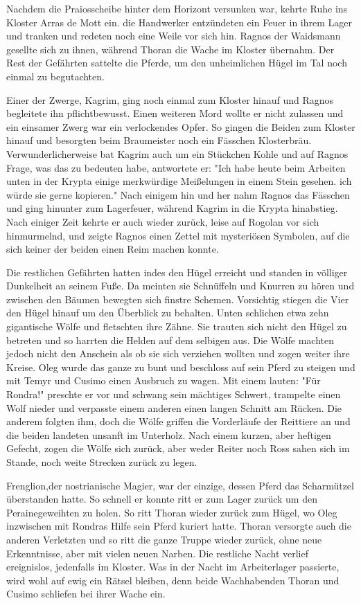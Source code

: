 \documentclass[11pt]{scrreprt}
\begin{document}
Nachdem die Praiosscheibe hinter dem Horizont versunken war, kehrte Ruhe ins Kloster Arras de Mott ein. die Handwerker entzündeten ein Feuer in ihrem Lager und tranken und redeten noch eine Weile vor sich hin. Ragnos der Waidsmann gesellte sich zu ihnen, während Thoran die Wache im Kloster übernahm. Der Rest der Gefährten sattelte die Pferde, um den unheimlichen Hügel im Tal noch einmal zu begutachten.\par
Einer der Zwerge, Kagrim, ging noch einmal zum Kloster hinauf und Ragnos begleitete ihn pflichtbewusst. Einen weiteren Mord wollte er nicht zulassen und ein einsamer Zwerg war ein verlockendes Opfer. So gingen die Beiden zum Kloster hinauf und besorgten beim Braumeister noch ein Fässchen Klosterbräu. Verwunderlicherweise bat Kagrim auch um ein Stückchen Kohle und auf Ragnos Frage, was das zu bedeuten habe, antwortete er: "Ich habe heute beim Arbeiten unten in der Krypta einige merkwürdige Meißelungen in einem Stein gesehen. ich würde sie gerne kopieren." Nach einigem hin und her nahm Ragnos das Fässchen und ging hinunter zum Lagerfeuer, während Kagrim in die Krypta hinabstieg. Nach einiger Zeit kehrte er auch wieder zurück, leise auf Rogolan vor sich hinmurmelnd, und zeigte Ragnos einen Zettel mit mysteriösen Symbolen, auf die sich keiner der beiden einen Reim machen konnte.\par
Die restlichen Gefährten hatten indes den Hügel erreicht und standen in völliger Dunkelheit an seinem Fuße. Da meinten sie Schnüffeln und Knurren zu hören und zwischen den Bäumen bewegten sich finstre Schemen. Vorsichtig stiegen die Vier den Hügel hinauf um den Überblick zu behalten. Unten schlichen etwa zehn gigantische Wölfe und fletschten ihre Zähne. Sie trauten sich nicht den Hügel zu betreten und so harrten die Helden auf dem selbigen aus. Die Wölfe machten jedoch nicht den Anschein als ob sie sich verziehen wollten und zogen weiter ihre Kreise. Oleg wurde das ganze zu bunt und beschloss auf sein Pferd zu steigen und mit Temyr und Cusimo einen Ausbruch zu wagen. Mit einem lauten: "Für Rondra!" preschte er vor und schwang sein mächtiges Schwert, trampelte einen Wolf nieder und verpasste einem anderen einen langen Schnitt am Rücken. Die anderem folgten ihm, doch die Wölfe griffen die Vorderläufe der Reittiere an und die beiden landeten unsanft im Unterholz. Nach einem kurzen, aber heftigen Gefecht, zogen die Wölfe sich zurück, aber weder Reiter noch Ross sahen sich im Stande, noch weite Strecken zurück zu legen.\par
Frenglion,der nostrianische Magier, war der einzige, dessen Pferd das Scharmützel überstanden hatte. So schnell er konnte ritt er zum Lager zurück um den Perainegeweihten zu holen. So ritt Thoran wieder zurück zum Hügel, wo Oleg inzwischen mit Rondras Hilfe sein Pferd kuriert hatte. Thoran versorgte auch die anderen Verletzten und so ritt die ganze Truppe wieder zurück, ohne neue Erkenntnisse, aber mit vielen neuen Narben. Die restliche Nacht verlief ereignislos, jedenfalls im Kloster. Was in der Nacht im Arbeiterlager passierte, wird wohl auf ewig ein Rätsel bleiben, denn beide Wachhabenden Thoran und Cusimo schliefen bei ihrer Wache ein.\par
\end{document}
